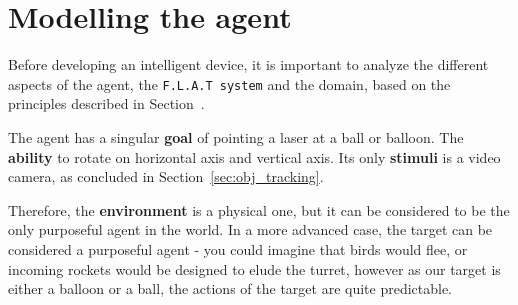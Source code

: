 \section{Modelling the agent}\label{Design:MI}
Before developing an intelligent device, it is important to analyze the different aspects of the agent, the \texttt{F.L.A.T system} and the domain, based on the principles described in Section~.


The agent has a singular \textbf{goal} of pointing a laser at a ball or balloon.
The \textbf{ability} to rotate on horizontal axis and vertical axis.
Its only \textbf{stimuli} is a video camera, as concluded in Section~\ref{sec:obj_tracking}.

Therefore, the \textbf{environment} is a physical one, but it can be considered to be the only purposeful agent in the world.
In a more advanced case, the target can be considered a purposeful agent - you could imagine that birds would flee, or incoming rockets would be designed to elude the turret, however as our target is either a balloon or a ball, the actions of the target are quite predictable.

